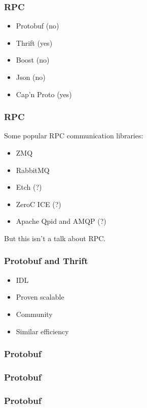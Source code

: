 \documentclass[t]{beamer}
\begin{document}
\begin{frame}
  \frametitle{RPC}

  \begin{itemize}
  \item Protobuf (no)
  \item Thrift (yes)
  \item Boost (no)
  \item Json (no)
  \item Cap'n Proto (yes)
  \end{itemize}
\end{frame}

\begin{frame}
  \frametitle{RPC}

  Some popular RPC communication libraries:
  \begin{itemize}
  \item ZMQ
  \item RabbitMQ
  \item Etch (?)
  \item ZeroC ICE (?)
  \item Apache Qpid and AMQP (?)
  \end{itemize}
  But this isn't a talk about RPC.
\end{frame}

\begin{frame}
  \frametitle{Protobuf and Thrift}

  \begin{itemize}
  \item IDL
  \item Proven scalable
  \item Community
  \item Similar efficiency
  \end{itemize}

\end{frame}

\begin{frame}
  \frametitle{Protobuf}
   
\end{frame}

\begin{frame}
  \frametitle{Protobuf}

  
\end{frame}

\begin{frame}
  \frametitle{Protobuf}

  
\end{frame}
\end{document}

